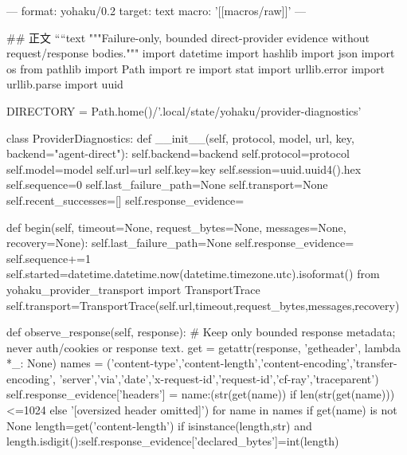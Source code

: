 ---
format: yohaku/0.2
target: text
macro: '[[macros/raw]]'
---

## 正文
````text
"""Failure-only, bounded direct-provider evidence without request/response bodies."""
import datetime
import hashlib
import json
import os
from pathlib import Path
import re
import stat
import urllib.error
import urllib.parse
import uuid

DIRECTORY = Path.home()/'.local/state/yohaku/provider-diagnostics'


class ProviderDiagnostics:
    def __init__(self, protocol, model, url, key, backend="agent-direct"):
        self.backend=backend
        self.protocol=protocol
        self.model=model
        self.url=url
        self.key=key
        self.session=uuid.uuid4().hex
        self.sequence=0
        self.last_failure_path=None
        self.transport=None
        self.recent_successes=[]
        self.response_evidence={}

    def begin(self, timeout=None, request_bytes=None, messages=None, recovery=None):
        self.last_failure_path=None
        self.response_evidence={}
        self.sequence+=1
        self.started=datetime.datetime.now(datetime.timezone.utc).isoformat()
        from yohaku_provider_transport import TransportTrace
        self.transport=TransportTrace(self.url,timeout,request_bytes,messages,recovery)

    def observe_response(self, response):
        # Keep only bounded response metadata; never auth/cookies or response text.
        get = getattr(response, 'getheader', lambda *_: None)
        names = ('content-type','content-length','content-encoding','transfer-encoding',
                 'server','via','date','x-request-id','request-id','cf-ray','traceparent')
        self.response_evidence['headers'] = {name:(str(get(name)) if len(str(get(name)))<=1024 else '[oversized header omitted]') for name in names if get(name) is not None}
        length=get('content-length')
        if isinstance(length,str) and length.isdigit():self.response_evidence['declared_bytes']=int(length)

